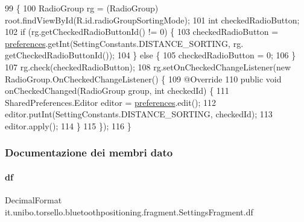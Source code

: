 \begin{DoxyCode}
99                                        \{
100         RadioGroup rg = (RadioGroup) root.findViewById(R.id.radioGroupSortingMode);
101         \textcolor{keywordtype}{int} checkedRadioButton;
102         \textcolor{keywordflow}{if} (rg.getCheckedRadioButtonId() != 0) \{
103             checkedRadioButton = \hyperlink{classit_1_1unibo_1_1torsello_1_1bluetoothpositioning_1_1fragment_1_1SettingsFragment_a52480c4d5d81ca59fe4a98ae3c623ea4_a52480c4d5d81ca59fe4a98ae3c623ea4}{preferences}.getInt(SettingConstants.DISTANCE\_SORTING, rg.
      getCheckedRadioButtonId());
104         \} \textcolor{keywordflow}{else} \{
105             checkedRadioButton = 0;
106         \}
107         rg.check(checkedRadioButton);
108         rg.setOnCheckedChangeListener(\textcolor{keyword}{new} RadioGroup.OnCheckedChangeListener() \{
109             @Override
110             \textcolor{keyword}{public} \textcolor{keywordtype}{void} onCheckedChanged(RadioGroup group, \textcolor{keywordtype}{int} checkedId) \{
111                 SharedPreferences.Editor editor = \hyperlink{classit_1_1unibo_1_1torsello_1_1bluetoothpositioning_1_1fragment_1_1SettingsFragment_a52480c4d5d81ca59fe4a98ae3c623ea4_a52480c4d5d81ca59fe4a98ae3c623ea4}{preferences}.edit();
112                 editor.putInt(SettingConstants.DISTANCE\_SORTING, checkedId);
113                 editor.apply();
114             \}
115         \});
116     \}
\end{DoxyCode}


\subsubsection{Documentazione dei membri dato}
\hypertarget{classit_1_1unibo_1_1torsello_1_1bluetoothpositioning_1_1fragment_1_1SettingsFragment_af6b80a700dc80c39a56d001b68a47694_af6b80a700dc80c39a56d001b68a47694}{}\label{classit_1_1unibo_1_1torsello_1_1bluetoothpositioning_1_1fragment_1_1SettingsFragment_af6b80a700dc80c39a56d001b68a47694_af6b80a700dc80c39a56d001b68a47694} 
\paragraph{\texorpdfstring{df}{df}}
{\footnotesize\ttfamily Decimal\+Format it.\+unibo.\+torsello.\+bluetoothpositioning.\+fragment.\+Settings\+Fragment.\+df\hspace{0.3cm}{\ttfamily [private]}}

